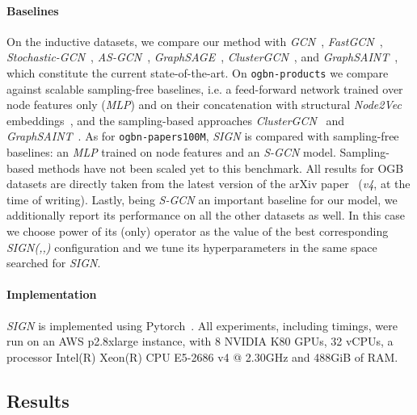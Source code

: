\documentclass{article}
\begin{document}
\paragraph{Baselines}
On the inductive datasets, we compare our method with \textit{GCN}~\cite{kipf2016semi}, \textit{FastGCN}~\cite{fastgcn}, \textit{Stochastic-GCN}~\cite{stochastic-training}, \textit{AS-GCN}~\cite{adaptive-sampling}, \textit{GraphSAGE}~\cite{GraphSAGE}, \textit{ClusterGCN}~\cite{Chiang:2019:CEA:3292500.3330925}, and \textit{GraphSAINT}~\cite{DBLP:journals/corr/abs-1907-04931}, which constitute the current state-of-the-art. On \texttt{ogbn-products} we compare against scalable sampling-free baselines, i.e. a feed-forward network trained over node features only (\textit{MLP}) and on their concatenation with structural \textit{Node2Vec} embeddings~\cite{grover2016node2vec}, and the sampling-based approaches  \textit{ClusterGCN}~\cite{Chiang:2019:CEA:3292500.3330925} and \textit{GraphSAINT}~\cite{DBLP:journals/corr/abs-1907-04931}. 
As for \texttt{ogbn-papers100M}, \textit{SIGN} is compared with sampling-free baselines: an \textit{MLP} trained on node features and an \textit{S-GCN} model. Sampling-based methods have not been scaled yet to this benchmark. All results for OGB datasets are directly taken from the latest version of the arXiv paper~\cite{ogb2020} (\emph{v4}, at the time of writing). Lastly, being \textit{S-GCN} an important baseline for our model, we additionally report its performance on all the other datasets as well. In this case we choose power  of its (only) operator  as the value  of the best corresponding \textit{SIGN(,,)} configuration and we tune its hyperparameters in the same space searched for \textit{SIGN}.

\paragraph{Implementation}
\textit{SIGN} is implemented using Pytorch~\cite{NEURIPS2019_9015}.
All experiments, including timings, were run on an AWS p2.8xlarge instance, with 8 NVIDIA K80 GPUs, 32 vCPUs, a processor Intel(R) Xeon(R) CPU E5-2686 v4 @ 2.30GHz and 488GiB of RAM. 

\subsection{Results}
\end{document}
